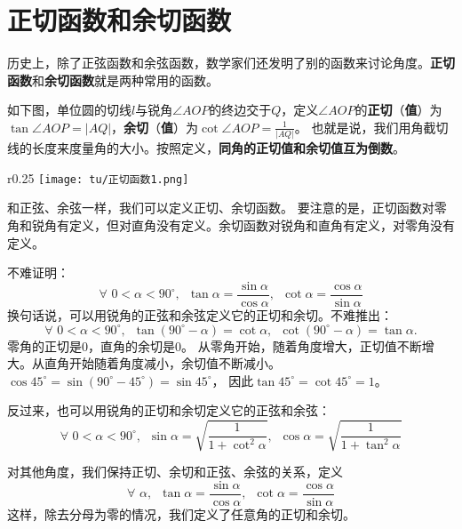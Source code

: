 \documentclass[12pt,UTF8]{ctexbook}
\begin{document}
\section{正切函数和余切函数}

历史上，除了正弦函数和余弦函数，数学家们还发明了别的函数来讨论角度。\textbf{正切函数}和\textbf{余切函数}就是两种常用的函数。

如下图，单位圆的切线$l$与锐角$\angle AOP$的终边交于$Q$，定义$\angle AOP$的\textbf{正切}（\textbf{值}）为
$\tan\angle AOP = |AQ|$，\textbf{余切}（\textbf{值}）为$\cot\angle AOP = \frac{1}{|AQ|}$。
也就是说，我们用角截切线的长度来度量角的大小。按照定义，\textbf{同角的正切值和余切值互为倒数}。

\begin{wrapfigure}[7]{r}{0.25\textwidth} %
    \vspace{-15pt}
    \flushright
    \texttt{[image: tu/正切函数1.png]}
\end{wrapfigure}

和正弦、余弦一样，我们可以定义正切、余切函数。
要注意的是，正切函数对零角和锐角有定义，但对直角没有定义。余切函数对锐角和直角有定义，对零角没有定义。

不难证明：
$$ \forall \,\, 0 < \alpha < 90^\circ, \,\,\, \tan \alpha = \frac{\sin \alpha}{\cos \alpha}, \,\,\, \cot \alpha = \frac{\cos \alpha}{\sin \alpha}$$
换句话说，可以用锐角的正弦和余弦定义它的正切和余切。不难推出：
$$ \forall \,\, 0 < \alpha < 90^\circ, \,\,\, \tan (90^\circ - \alpha) = \cot \alpha, \,\,\, \cot (90^\circ - \alpha) = \tan \alpha. $$
零角的正切是$0$，直角的余切是$0$。
从零角开始，随着角度增大，正切值不断增大。从直角开始随着角度减小，余切值不断减小。
$\cos 45^\circ = \sin (90^\circ - 45^\circ) = \sin 45^\circ $，
因此$\tan 45^\circ = \cot 45^\circ = 1$。

反过来，也可以用锐角的正切和余切定义它的正弦和余弦：
$$ \forall \,\, 0 < \alpha < 90^\circ, \,\,\, \sin \alpha = \sqrt{\frac{1}{1 + \cot^2 \alpha}}, \,\,\, \cos \alpha = \sqrt{\frac{1}{1 + \tan^2 \alpha}}$$

对其他角度，我们保持正切、余切和正弦、余弦的关系，定义
$$ \forall \,\,  \alpha, \,\,\, \tan \alpha = \frac{\sin \alpha}{\cos \alpha}, \,\,\, \cot \alpha = \frac{\cos \alpha}{\sin \alpha}$$
这样，除去分母为零的情况，我们定义了任意角的正切和余切。
\end{document}
